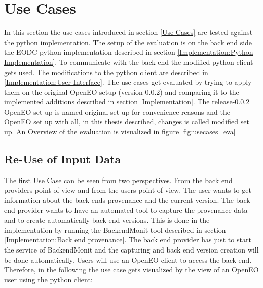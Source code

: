 \documentclass[draft,final]{vutinfth} %
\begin{document}
\section{Use Cases}\label{Evaluation:Use Cases}
In this section the use cases introduced in section \ref{Use Cases} are tested against the python implementation. The setup of the evaluation is on the back end side the EODC python implementation described in section \ref{Implementation:Python Implementation}. To communicate with the back end the modified python client gets used. The modifications to the python client are described in \ref{Implementation:User Interface}. The use cases get evaluated by trying to apply them on the original OpenEO setup (version 0.0.2) and comparing it to the implemented additions described in section \ref{Implementation}. The release-0.0.2 OpenEO set up is named original set up for convenience reasons and the OpenEO set up with all, in this thesis described, changes is called modified set up. An Overview of the evaluation is visualized in figure \ref{fig:usecases_eva} 

\subsection{Re-Use of Input Data}\label{Evaluation:Use Case1}
The first Use Case can be seen from two perspectives. From the back end providers point of view and from the users point of view. The user wants to get information about the back ends provenance and the current version. The back end provider wants to have an automated tool to capture the provenance data and to create automatically back end versions. This is done in the implementation by running the BackendMonit tool described in section \ref{Implementation:Back end provenance}. The back end provider has just to start the service of BackendMonit and the capturing and back end version creation will be done automatically. 
Users will use an OpenEO client to access the back end. Therefore, in the following the use case gets visualized by the view of an OpenEO user using the python client: 
\end{document}
